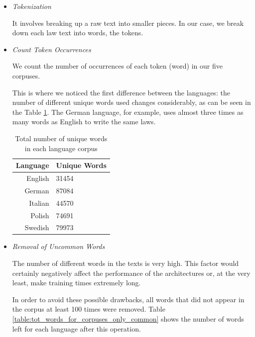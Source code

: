 \documentclass[letterpaper,11pt]{article}
\begin{document}
\begin{itemize}
  \item \textit{Tokenization}
  
  It involves breaking up a raw text into smaller pieces. In our case, we break down each law text into words, the tokens. 

  \item \textit{Count Token Occurrences}
  
  We count the number of occurrences of each token (word) in our five corpuses.

  This is where we noticed the first difference between the languages: the number of different unique words used changes considerably, as can be seen in the Table \ref{table:tot_words_for_corpuses}. The German language, for example, uses almost three times as many words as English to write the same laws.

 \begin{table}[H]
    \centering
    \begin{tabular}{@{}rl@{}}
    \toprule
    \multicolumn{1}{c}{\textbf{Language}} & \textbf{Unique Words} \\ \midrule
    English                               & 31454                 \\
    German                                & 87084                 \\
    Italian                               & 44570                 \\
    Polish                                & 74691                 \\
    Swedish                               & 79973                 \\ \bottomrule
    \end{tabular}
    \caption{Total number of unique words in each language corpus}
    \label{table:tot_words_for_corpuses}
    \end{table}


  \item \textit{Removal of Uncommon Words}
  
  The number of different words in the texts is very high. This factor would certainly negatively affect the performance of the architectures or, at the very least, make training times extremely long. 
  
  In order to avoid these possible drawbacks, all words that did not appear in the corpus at least 100 times were removed. Table \ref{table:tot_words_for_corpuses_only_common} shows the number of words left for each language after this operation.
  

\end{itemize}
\end{document}
